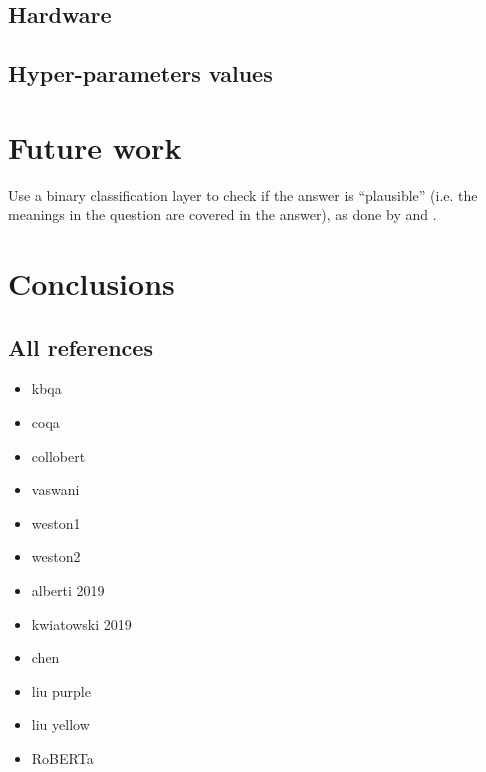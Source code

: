 \documentclass[12pt,a4paper,hidelinks]{article}
\begin{document}
\subsection{Hardware}


\subsection{Hyper-parameters values}

\section{Future work}\label{sec:future_work}
Use a binary classification layer to check if the answer is ``plausible'' (i.e. the meanings in the question are covered in the answer), as done by \cite{Hu2019ReadV} and \cite{Back2020NeurQuRI}.



\section{Conclusions}\label{sec:conclusions}

\subsection{All references}

\begin{itemize}
  \item kbqa~\cite{kbqa}    
  \item coqa~\cite{coqa}
  \item collobert~\cite{Collobert}
  \item vaswani~\cite{vaswani}
  \item weston1~\cite{weston-tracking}
  \item weston2~\cite{weston-reading}
  \item alberti 2019~\cite{alberti}
  \item kwiatowski 2019~\cite{kwiatowski}
  \item chen~\cite{chen}
  \item liu purple~\cite{liu-purple}
  \item liu yellow~\cite{liu-yellow}
  \item RoBERTa~\cite{roberta}
\end{itemize}




\end{document}
